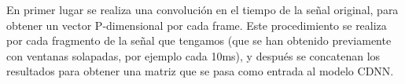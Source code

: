 \documentclass[11pt]{article}
\begin{document}
En primer lugar se realiza una convolución en el tiempo de la señal original, para obtener un vector P-dimensional por cada frame. Este procedimiento se realiza por cada fragmento de la señal que tengamos (que se han obtenido previamente con ventanas solapadas, por ejemplo cada 10ms), y después se concatenan los resultados para obtener una matriz que se pasa como entrada al modelo CDNN.
\end{document}
